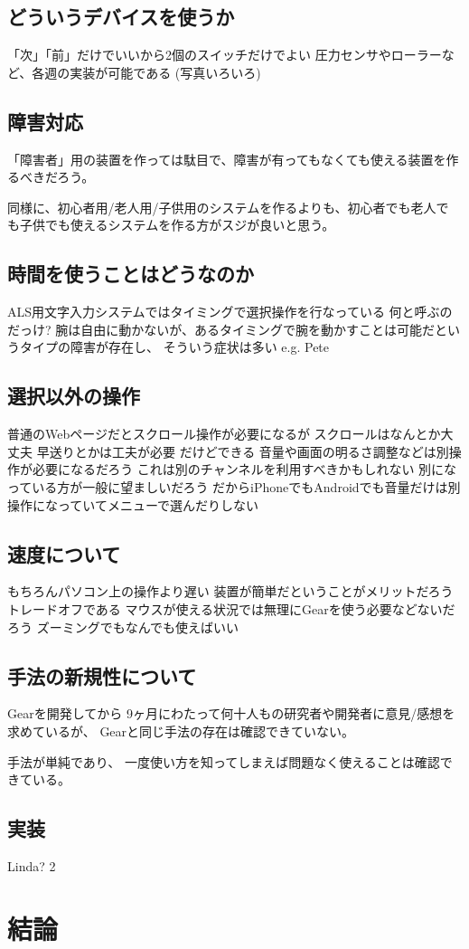 \documentclass[twoside]{wiss}
\begin{document}
\subsection*{どういうデバイスを使うか}
  「次」「前」だけでいいから2個のスイッチだけでよい
   圧力センサやローラーなど、各週の実装が可能である
   (写真いろいろ)

\subsection*{障害対応}

「障害者」用の装置を作っては駄目で、障害が有ってもなくても使える装置を作るべきだろう。

同様に、初心者用/老人用/子供用のシステムを作るよりも、初心者でも老人で
も子供でも使えるシステムを作る方がスジが良いと思う。

\subsection*{時間を使うことはどうなのか}

ALS用文字入力システムではタイミングで選択操作を行なっている
  何と呼ぶのだっけ?
  腕は自由に動かないが、あるタイミングで腕を動かすことは可能だというタイプの障害が存在し、
    そういう症状は多い
e.g. Pete

\subsection*{選択以外の操作}

普通のWebページだとスクロール操作が必要になるが
  スクロールはなんとか大丈夫
  早送りとかは工夫が必要
    だけどできる
音量や画面の明るさ調整などは別操作が必要になるだろう
     これは別のチャンネルを利用すべきかもしれない
     別になっている方が一般に望ましいだろう
       だからiPhoneでもAndroidでも音量だけは別操作になっていてメニューで選んだりしない

\subsection*{速度について}
   もちろんパソコン上の操作より遅い
   装置が簡単だということがメリットだろう
     トレードオフである
   マウスが使える状況では無理にGearを使う必要などないだろう
     ズーミングでもなんでも使えばいい

\subsection*{手法の新規性について}

Gearを開発してから
9ヶ月にわたって何十人もの研究者や開発者に意見/感想を求めているが、
Gearと同じ手法の存在は確認できていない。

手法が単純であり、
一度使い方を知ってしまえば問題なく使えることは確認できている。

\subsection*{実装}

Linda?
2
\section{結論}

{\scriptsize


}
\end{document}
